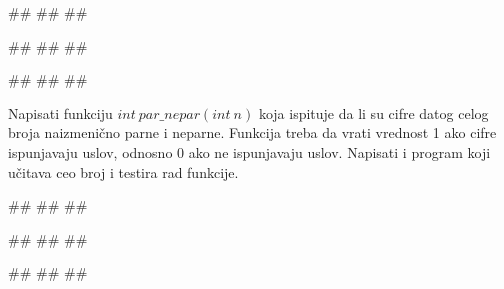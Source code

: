 \begin{Exercise}[label=p1.4_]
\begin{Exercise}[label=p1.4_15]
\begin{miditest}
\begin{upotreba}{1}
#\naslovInt#
##
##
\end{upotreba}
\end{miditest}
\begin{miditest}
\begin{upotreba}{2}
#\naslovInt#
##
##
\end{upotreba}
\end{miditest}

\begin{miditest}
\begin{upotreba}{3}
#\naslovInt#
##
##
\end{upotreba}
\end{miditest}

\end{Exercise}
\begin{Answer}[ref=p1.4_15]
\end{Answer}

\begin{Exercise}[label=p1.4_16] 
  Napisati funkciju $int\ par\_nepar(int\ n)$ koja ispituje da li su cifre datog celog broja naizmenično parne i neparne. Funkcija treba da vrati vrednost 1 ako cifre ispunjavaju uslov, odnosno 0 ako ne ispunjavaju uslov. Napisati i program koji učitava ceo broj i testira rad funkcije. 
  
\begin{miditest}
\begin{upotreba}{1}
#\naslovInt#
##
##
\end{upotreba}
\end{miditest}
\begin{miditest}
\begin{upotreba}{2}
#\naslovInt#
##
##
\end{upotreba}
\end{miditest}

\begin{miditest}
\begin{upotreba}{3}
#\naslovInt#
##
##
\end{upotreba}
\end{miditest}


\end{Exercise}
\end{Exercise}
